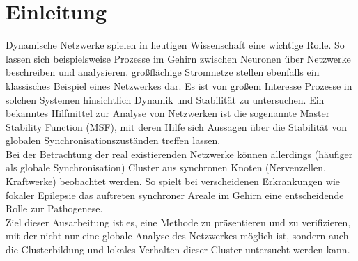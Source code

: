 \section{Einleitung}\label{einleitung}
Dynamische Netzwerke spielen in heutigen Wissenschaft eine wichtige Rolle. So lassen sich beispielsweise Prozesse im Gehirn zwischen Neuronen über Netzwerke beschreiben und analysieren. großflächige Stromnetze stellen ebenfalls ein klassisches Beispiel eines Netzwerkes dar. Es ist von großem Interesse Prozesse in solchen Systemen hinsichtlich Dynamik und Stabilität zu untersuchen. Ein bekanntes Hilfmittel zur Analyse von Netzwerken ist die sogenannte Master Stability Function (MSF), mit deren Hilfe sich Aussagen über die Stabilität von globalen Synchronisationszuständen treffen lassen.\\
Bei der Betrachtung der real existierenden Netzwerke können allerdings (häufiger als globale Synchronisation) Cluster aus synchronen Knoten (Nervenzellen, Kraftwerke) beobachtet werden. So spielt bei verscheidenen Erkrankungen wie fokaler Epilepsie das auftreten synchroner Areale im Gehirn eine entscheidende Rolle zur Pathogenese.\\
Ziel dieser Ausarbeitung ist es, eine Methode zu präsentieren und zu verifizieren, mit der nicht nur eine globale Analyse des Netzwerkes möglich ist, sondern auch die Clusterbildung und lokales Verhalten dieser Cluster untersucht werden kann.